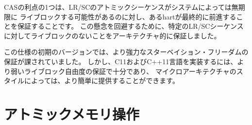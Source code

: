 \begin{commentary}
\begin{comment}
One advantage of CAS is that it guarantees that some hart eventually
makes progress, whereas an LR/SC atomic sequence could livelock
indefinitely on some systems.  To avoid this concern, we added an
architectural guarantee of livelock freedom for certain LR/SC sequences.
\end{comment}

CASの利点の1つは、LR/SCのアトミックシーケンスがシステムによっては無期限に
ライブロックする可能性があるのに対し、あるhartが最終的に前進することを保証することです。
この懸念を回避するために、特定のLR/SCシーケンスに対してライブロックのないことをアーキテクチャ的に保証しました。

\begin{comment}
Earlier versions of this specification imposed a stronger starvation-freedom
guarantee.  However, the weaker livelock-freedom guarantee is sufficient to
implement the C11 and C++11 languages, and is substantially easier to provide
in some microarchitectural styles.
\end{comment}
この仕様の初期のバージョンでは、より強力なスターベイション・フリーダムの保証が課されていました。
しかし、C11およびC++11言語を実装するには、より弱いライブロック自由度の保証で十分であり、
マイクロアーキテクチャのスタイルによっては、より簡単に提供することができます。
\end{commentary}

\begin{comment}
\section{Atomic Memory Operations}
\end{comment}
\section{アトミックメモリ操作}
\label{sec:amo}

